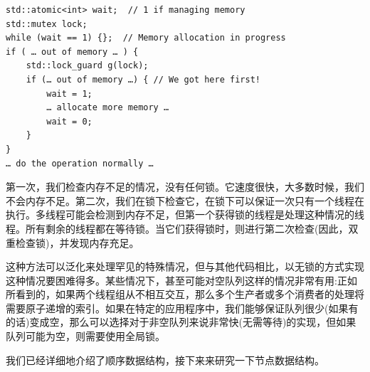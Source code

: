 \begin{lstlisting}[style=styleCXX]
std::atomic<int> wait;  // 1 if managing memory
std::mutex lock;
while (wait == 1) {};  // Memory allocation in progress
if ( … out of memory … ) {
	std::lock_guard g(lock);
	if (… out of memory …) { // We got here first!
		wait = 1;
		… allocate more memory …
		wait = 0;
	}
}
… do the operation normally …
\end{lstlisting}

第一次，我们检查内存不足的情况，没有任何锁。它速度很快，大多数时候，我们不会内存不足。第二次，我们在锁下检查它，在锁下可以保证一次只有一个线程在执行。多线程可能会检测到内存不足，但第一个获得锁的线程是处理这种情况的线程。所有剩余的线程都在等待锁。当它们获得锁时，则进行第二次检查(因此，双重检查锁)，并发现内存充足。

这种方法可以泛化来处理罕见的特殊情况，但与其他代码相比，以无锁的方式实现这种情况要困难得多。某些情况下，甚至可能对空队列这样的情况非常有用:正如所看到的，如果两个线程组从不相互交互，那么多个生产者或多个消费者的处理将需要原子递增的索引。如果在特定的应用程序中，我们能够保证队列很少(如果有的话)变成空，那么可以选择对于非空队列来说非常快(无需等待)的实现，但如果队列可能为空，则需要使用全局锁。

我们已经详细地介绍了顺序数据结构，接下来来研究一下节点数据结构。






























